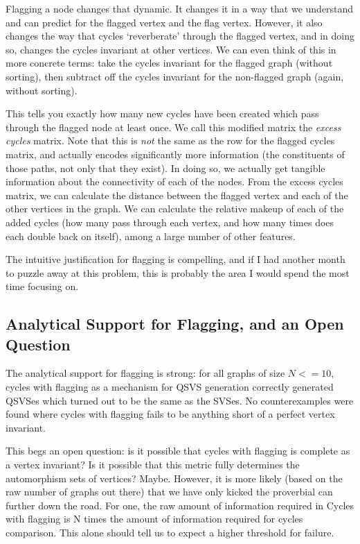Flagging a node changes that dynamic.
It changes it in a way that we understand and can predict for the flagged vertex and the flag vertex.
However, it also changes the way that cycles `reverberate' through the flagged vertex, and in doing so, changes the cycles invariant at other vertices.
We can even think of this in more concrete terms: take the cycles invariant for the flagged graph (without sorting), then subtract off the cycles invariant for the non-flagged graph (again, without sorting).

This tells you exactly how many new cycles have been created which pass through the flagged node at least once.
We call this modified matrix the \emph{excess cycles} matrix.
Note that this is \emph{not} the same as the row for the flagged cycles matrix, and actually encodes significantly more information (the constituents of those paths, not only that they exist).
In doing so, we actually get tangible information about the connectivity of each of the nodes.
From the excess cycles matrix, we can calculate the distance between the flagged vertex and each of the other vertices in the graph.
We can calculate the relative makeup of each of the added cycles (how many pass through each vertex, and how many times does each double back on itself), among a large number of other features.

The intuitive justification for flagging is compelling, and if I had another month to puzzle away at this problem, this is probably the area I would spend the most time focusing on.

\subsection{Analytical Support for Flagging, and an Open Question}

The analytical support for flagging is strong:
for all graphs of size $N<=10$, cycles with flagging as a mechanism for QSVS generation correctly generated QSVSes which turned out to be the same as the SVSes.
No counterexamples were found where cycles with flagging fails to be anything short of a perfect vertex invariant.

This begs an open question: is it possible that cycles with flagging is complete as a vertex invariant?
Is it possible that this metric fully determines the automorphism sets of vertices? Maybe.
However, it is more likely (based on the raw number of graphs out there) that we have only kicked the proverbial can further down the road.
For one, the raw amount of information required in Cycles with flagging is N times the amount of information required for cycles comparison.
This alone should tell us to expect a higher threshold for failure.

